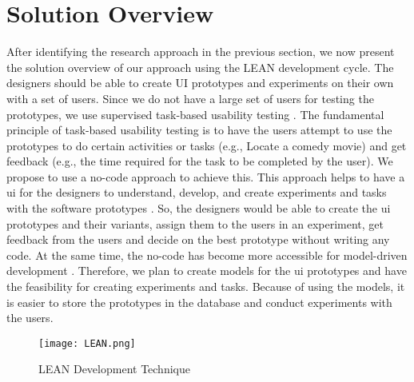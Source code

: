 \clearpage
\section{Solution Overview}
\label{introduction:section:solution}
After identifying the research approach in the previous section, we now present the solution overview of our approach using the LEAN development cycle.
The designers should be able to create UI prototypes and experiments on their own with a set of users.
Since we do not have a large set of users for testing the prototypes, we use supervised task-based usability testing \cite{article:dataanalysis:supervisedtest}.
The fundamental principle of task-based usability testing is to have the users attempt to use the prototypes to do certain activities or tasks (e.g., Locate a comedy movie) and get feedback (e.g., the time required for the task to be completed by the user).
We propose to use a no-code approach to achieve this.
This approach helps to have a \ac{ui} for the designers to understand, develop, and create experiments and tasks with the software prototypes \cite{paper:lowcode:khorram}.
So, the designers would be able to create the \ac{ui} prototypes and their variants, assign them to the users in an experiment, get feedback from the users and decide on the best prototype without writing any code.
At the same time, the no-code has become more accessible for model-driven development \cite{article:lowcode:modeldriven}.
Therefore, we plan to create models for the \ac{ui} prototypes and have the feasibility for creating experiments and tasks. 
Because of using the models, it is easier to store the prototypes in the database and conduct experiments with the users. 
\begin{figure}[ht]
    \centering
    \texttt{[image: LEAN.png]}
    \caption{LEAN Development Technique}
    \label{intro:fig:lean}
\end{figure}

